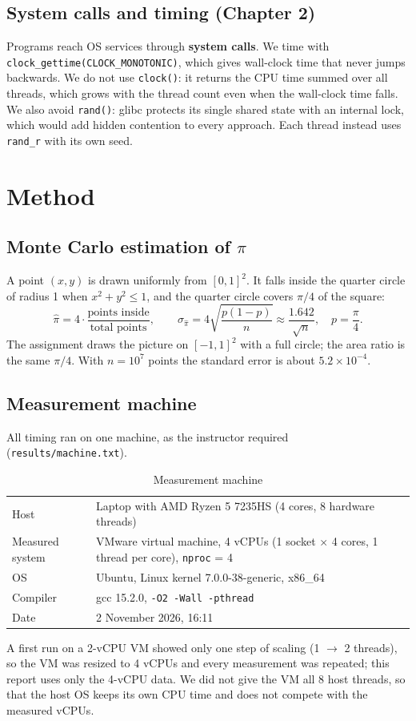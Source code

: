 \documentclass[11pt,a4paper]{article}
\newcommand{\code}[1]{\texttt{#1}}
\begin{document}
\subsection{System calls and timing (Chapter 2)}
Programs reach OS services through \textbf{system calls}. We time with \code{clock\_gettime(CLOCK\_MONOTONIC)}, which gives wall-clock time that never jumps backwards. We do not use \code{clock()}: it returns the CPU time summed over all threads, which grows with the thread count even when the wall-clock time falls. We also avoid \code{rand()}: glibc protects its single shared state with an internal lock, which would add hidden contention to every approach. Each thread instead uses \code{rand\_r} with its own seed.

\section{Method}
\subsection{Monte Carlo estimation of $\pi$}
A point $(x,y)$ is drawn uniformly from $[0,1]^2$. It falls inside the quarter circle of radius 1 when $x^2+y^2\le 1$, and the quarter circle covers $\pi/4$ of the square:
\begin{equation}
  \hat\pi = 4\cdot\frac{\text{points inside}}{\text{total points}}, \qquad
  \sigma_{\hat\pi} = 4\sqrt{\frac{p(1-p)}{n}} \approx \frac{1.642}{\sqrt n}, \quad p=\frac{\pi}{4}.
  \label{eq:se}
\end{equation}
The assignment draws the picture on $[-1,1]^2$ with a full circle; the area ratio is the same $\pi/4$. With $n=10^7$ points the standard error is about $5.2\times10^{-4}$.

\subsection{Measurement machine}
All timing ran on one machine, as the instructor required (\code{results/machine.txt}).
\begin{table}[H]
\centering
\caption{Measurement machine}
\begin{tabularx}{\textwidth}{lX}
\toprule
Host & Laptop with AMD Ryzen 5 7235HS (4 cores, 8 hardware threads) \\
Measured system & VMware virtual machine, 4 vCPUs (1 socket $\times$ 4 cores, 1 thread per core), \code{nproc} = 4 \\
OS & Ubuntu, Linux kernel 7.0.0-38-generic, x86\_64 \\
Compiler & gcc 15.2.0, \code{-O2 -Wall -pthread} \\
Date & 2 November 2026, 16:11 \\
\bottomrule
\end{tabularx}
\end{table}
A first run on a 2-vCPU VM showed only one step of scaling (1 $\to$ 2 threads), so the VM was resized to 4 vCPUs and every measurement was repeated; this report uses only the 4-vCPU data. We did not give the VM all 8 host threads, so that the host OS keeps its own CPU time and does not compete with the measured vCPUs.
\end{document}
